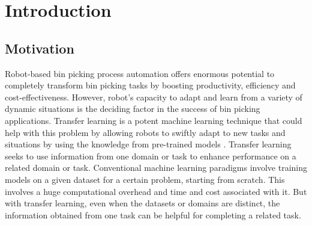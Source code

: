 \section{Introduction}
\subsection{Motivation}
Robot-based bin picking process automation offers enormous potential to completely transform bin picking tasks by boosting productivity, efficiency and cost-effectiveness. However, robot's capacity to adapt and learn from a variety of dynamic situations is the deciding factor in the success of bin picking applications. Transfer learning is a potent machine learning technique that could help with this problem by allowing robots to swiftly adapt to new tasks and situations by using the knowledge from pre-trained models \cite{danielthesis}. Transfer learning seeks to use information from one domain or task to enhance performance on a related domain or task. Conventional machine learning paradigms involve training models on a given dataset for a certain problem, starting from scratch. This involves a huge computational overhead and time and cost associated with it. But with transfer learning, even when the datasets or domains are distinct, the information obtained from one task can be helpful for completing a related task.

\vspace{5mm}

